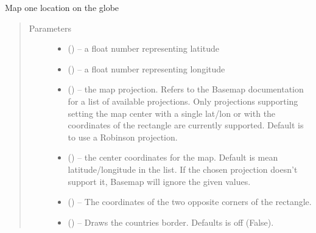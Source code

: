 \documentclass[letterpaper,10pt,english]{sphinxmanual}
\begin{document}

\begin{fulllineitems}
\label{\detokenize{Map:pyleoclim.Map.mapOne}}
Map one location on the globe
\begin{quote}\begin{description}
\item[{Parameters}] \leavevmode\begin{itemize}
\item {} 
 () -- a float number representing latitude

\item {} 
 () -- a float number representing longitude

\item {} 
 () -- the map projection. Refers to the Basemap
documentation for a list of available projections. Only projections
supporting setting the map center with a single lat/lon or with
the coordinates of the rectangle are currently supported.
Default is to use a Robinson projection.

\item {} 
 (\sphinxstyleliteralemphasis{,}\sphinxstyleliteralemphasis{}) -- the center coordinates for the map. Default is
mean latitude/longitude in the list.
If the chosen projection doesn't support it, Basemap will
ignore the given values.

\item {} 
\sphinxstyleliteralstrong{, }\sphinxstyleliteralstrong{, } (\sphinxstyleliteralemphasis{,}\sphinxstyleliteralemphasis{}) -- The coordinates
of the two opposite corners of the rectangle.

\item {} 
 () -- Draws the countries border. Defaults is off (False).


\end{itemize}
\end{description}
\end{quote}
\end{fulllineitems}
\end{document}
